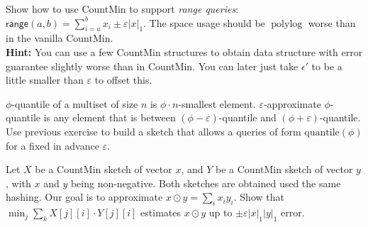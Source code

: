 \documentclass[12pt]{uebung}
\begin{document}
 


\renewcommand{\aufgname}{Exercise}

\begin{aufg}
Show how to use \textsf{CountMin} to support \emph{range queries}: $\textsf{range}(a,b) = \sum_{i=a}^b x_i \pm \varepsilon |x|_1$.
The space usage should be $\textrm{poly} \log$ worse than in the vanilla \textsf{CountMin}.\\
\textbf{Hint:} You can use a few \textsf{CountMin} structures to obtain data structure with error guarantee slightly worse than in \textsf{CountMin}. You can later just take $\epsilon'$ to be a little smaller than $\varepsilon$ to offset this.
\end{aufg}

\begin{aufg}[Quantiles]
$\phi$-quantile of a multiset of size $n$ is $\phi \cdot n$-smallest element. $\varepsilon$-approximate $\phi$-quantile is any element that is between $(\phi-\varepsilon)$-quantile and $(\phi+\varepsilon)$-quantile. Use previous exercise to build a sketch that allows a queries of form $\textrm{quantile}(\phi)$ for a fixed in advance $\varepsilon$.
\end{aufg}


\begin{aufg}
Let $X$ be a \textsf{CountMin} sketch of vector $x$, and $Y$ be a \textsf{CountMin} sketch of vector $y$, with $x$ and $y$ being non-negative. Both sketches are obtained used the same hashing. Our goal is to approximate $x \odot y = \sum_i x_i y_i$. Show that $\min_j \sum_k X[j][i] \cdot Y[j][i]$ estimates $x \odot y$ up to $\pm \varepsilon |x|_1 |y|_1$ error.
\end{aufg}
\end{document}
